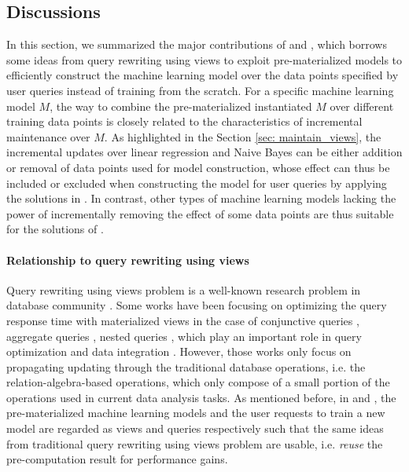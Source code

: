 \subsection{Discussions}
In this section, we summarized the major contributions of \cite{gupta2015processing} and \cite{hasani2018efficient}, which borrows some ideas from query rewriting using views to exploit pre-materialized models to efficiently construct the machine learning model over the data points specified by user queries instead of training from the scratch. For a specific machine learning model $M$, the way to combine the pre-materialized instantiated $M$ over different training data points is closely related to the characteristics of incremental maintenance over $M$. As highlighted in the Section \ref{sec: maintain_views}, the incremental updates over linear regression and Naive Bayes can be either addition or removal of data points used for model construction, whose effect can thus be included or excluded when constructing the model for user queries by applying the solutions in \cite{gupta2015processing}. In contrast, other types of machine learning models lacking the power of incrementally removing the effect of some data points are thus suitable for the solutions of \cite{hasani2018efficient}.

\paragraph{Relationship to query rewriting using views} Query rewriting using views problem is a well-known research problem in database community \cite{halevy2001answering}. Some works have been focusing on optimizing the query response time with materialized views in the case of conjunctive queries \cite{chandra1977optimal, chaudhuri1995optimizing, pottinger2000scalable, afrati2007using}, aggregate queries \cite{cohen2007deciding, cohen1999rewriting, srivastava1996answering, galindo2001orthogonal}, nested queries \cite{zaharioudakis2000answering}, which play an important role in query optimization and data integration \cite{halevy2001answering}. However, those works only focus on propagating updating through the traditional database operations, i.e. the relation-algebra-based operations, which only compose of a small portion of the operations used in current data analysis tasks. As mentioned before, in \cite{gupta2015processing} and \cite{hasani2018efficient}, the pre-materialized machine learning models and the user requests to train a new model are regarded as views and queries respectively such that the same ideas from traditional query rewriting using views problem are usable, i.e. {\em reuse} the pre-computation result for performance gains.

